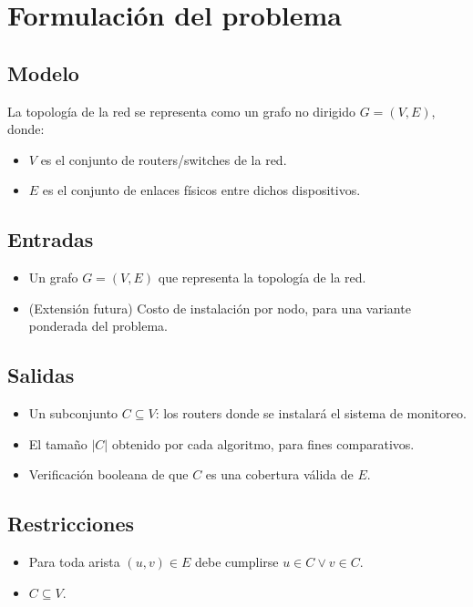 \documentclass[11pt,a4paper]{article}
\begin{document}
\section{Formulación del problema}

\subsection{Modelo}
La topología de la red se representa como un grafo no dirigido $G = (V, E)$, donde:
\begin{itemize}
	\item $V$ es el conjunto de routers/switches de la red.
	\item $E$ es el conjunto de enlaces físicos entre dichos dispositivos.
\end{itemize}

\subsection{Entradas}
\begin{itemize}
	\item Un grafo $G = (V, E)$ que representa la topología de la red.
	\item (Extensión futura) Costo de instalación por nodo, para una variante ponderada
	del problema.
\end{itemize}

\subsection{Salidas}
\begin{itemize}
	\item Un subconjunto $C \subseteq V$: los routers donde se instalará el sistema de
	monitoreo.
	\item El tamaño $|C|$ obtenido por cada algoritmo, para fines comparativos.
	\item Verificación booleana de que $C$ es una cobertura válida de $E$.
\end{itemize}

\subsection{Restricciones}
\begin{itemize}
	\item Para toda arista $(u,v) \in E$ debe cumplirse $u \in C \lor v \in C$.
	\item $C \subseteq V$.
\end{itemize}
\end{document}
